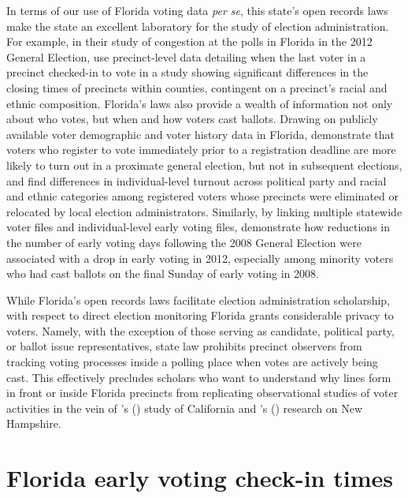 \documentclass[12pt,titlepage]{article}
\newcommand{\possessivecite}[1]{\citeauthor{#1}'s (\citeyear{#1})}
\begin{document}
In terms of our use of Florida voting data \emph{per se}, this state's
open records laws make the state an excellent laboratory for the study
of election administration. For example, in their study of congestion
at the polls in Florida in the 2012 General Election,
\cite{herronsmith:closingtimes} use precinct-level data detailing when
the last voter in a precinct checked-in to vote in a study showing
significant differences in the closing times of precincts within
counties, contingent on a precinct's racial and ethnic
composition. Florida's laws also provide a wealth of information not
only about who votes, but when and how voters cast ballots.  Drawing
on publicly available voter demographic and voter history data in
Florida, \cite{shinosmith:registrationtiming} demonstrate that voters
who register to vote immediately prior to a registration deadline are
more likely to turn out in a proximate general election, but not in
subsequent elections, and \cite{amos_etal2017} find differences in
individual-level turnout across political party and racial and ethnic
categories among registered voters whose precincts were eliminated or
relocated by local election administrators.  Similarly, by linking
multiple statewide voter files and individual-level early voting
files, \cite{herron_smith2014} demonstrate how reductions in the
number of early voting days following the 2008 General Election were
associated with a drop in early voting in 2012, especially among
minority voters who had cast ballots on the final Sunday of early
voting in 2008.


While Florida's open records laws facilitate election administration
scholarship, with respect to direct election monitoring Florida grants
considerable privacy to voters.  Namely, with the exception of those
serving as candidate, political party, or ballot issue
representatives, state law prohibits precinct observers from tracking
voting processes inside a polling place when votes are actively being
cast. This effectively precludes scholars who want to understand why
lines form in front or inside Florida precincts from replicating
observational studies of voter activities in the vein of
\possessivecite{spencermarkovits:renege} study of California and
\possessivecite{herronsmith:hanoverstudy} research on New Hampshire.

\section*{Florida early voting check-in times}
\end{document}
